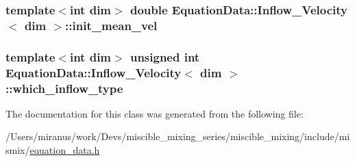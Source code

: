 \subsubsection[{init\+\_\+mean\+\_\+vel}]{\setlength{\rightskip}{0pt plus 5cm}template$<$int dim$>$ double {\bf Equation\+Data\+::\+Inflow\+\_\+\+Velocity}$<$ dim $>$\+::init\+\_\+mean\+\_\+vel}\label{class_equation_data_1_1_inflow___velocity_a00fdc2d87172dbf05e274529d53e4874}
\hypertarget{class_equation_data_1_1_inflow___velocity_affb59b1d9b0d574a0aec58652b6dff88}{}
\subsubsection[{which\+\_\+inflow\+\_\+type}]{\setlength{\rightskip}{0pt plus 5cm}template$<$int dim$>$ unsigned int {\bf Equation\+Data\+::\+Inflow\+\_\+\+Velocity}$<$ dim $>$\+::which\+\_\+inflow\+\_\+type}\label{class_equation_data_1_1_inflow___velocity_affb59b1d9b0d574a0aec58652b6dff88}


The documentation for this class was generated from the following file\+:\begin{DoxyCompactItemize}
\item 
/\+Users/miranus/work/\+Devs/miscible\+\_\+mixing\+\_\+series/miscible\+\_\+mixing/include/mismix/\hyperlink{equation__data_8h}{equation\+\_\+data.\+h}\end{DoxyCompactItemize}
